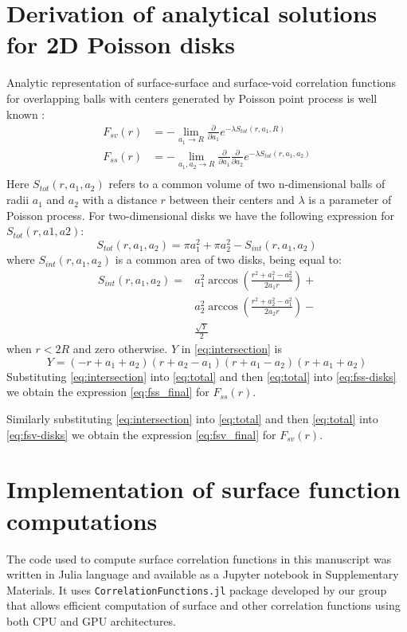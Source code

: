 \documentclass[reprint,amsmath,amssymb,aps,pre]{revtex4-1}
\newcommand{\code}[1]{\colorbox{light-gray}{\texttt{#1}}}
\begin{document}
\section{Derivation of analytical solutions for 2D Poisson disks}
\label{ap:overlapping-disks}
Analytic representation of surface-surface and surface-void correlation
functions for overlapping balls with centers generated by Poisson point process
is well known \cite{Torq_book}:
\begin{align}
  F_{sv}(r) &= -\lim_{a_1 \rightarrow R} \frac{\partial}{\partial a_1}
  e^{-\lambda S_{tot}(r, a_1, R)} \label{eq:fsv-disks} \\
  F_{ss}(r) &= -\lim_{a_1, a_2 \rightarrow R} \frac{\partial}{\partial a_1}
  \frac{\partial}{\partial a_2} e^{-\lambda S_{tot}(r, a_1,
    a_2)} \label{eq:fss-disks} \\
\end{align}
Here $S_{tot}(r, a_1, a_2)$ refers to a common volume of two n-dimensional balls
of radii $a_1$ and $a_2$ with a distance $r$ between their centers and $\lambda$
is a parameter of Poisson process. For two-dimensional disks we have the
following expression for $S_{tot}(r, a1, a2)$:
\begin{equation}
  S_{tot}(r, a_1, a_2) = \pi a_1^2 + \pi a_2^2 - S_{int}(r, a_1, a_2) \label{eq:total}
\end{equation}
where $S_{int}(r, a_1, a_2)$ is a common area of two disks, being equal to:
\cite{Math_stack_link}
\begin{align}
  S_{int}(r, a_1, a_2) =&  a_1^2 \arccos(\frac{r^2+a_1^2-a_2^2}{2a_1r}) + \\
  & a_2^2 \arccos(\frac{r^2+a_2^2-a_1^2}{2a_2r}) - \\
  & \frac{\sqrt{Y}}{2} \label{eq:intersection}
\end{align}
when $r<2R$ and zero otherwise. $Y$ in \cref{eq:intersection} is
\begin{equation*}
  Y = (-r+a_1+a_2)(r+a_2-a_1)(r+a_1-a_2)(r+a_1+a_2)
\end{equation*}
Substituting \cref{eq:intersection} into \cref{eq:total} and then
\cref{eq:total} into \cref{eq:fss-disks} we obtain the expression
\cref{eq:fss_final} for $F_{ss}(r)$.

Similarly substituting \cref{eq:intersection} into \cref{eq:total} and then
\cref{eq:total} into \cref{eq:fsv-disks} we obtain the expression
\cref{eq:fsv_final} for $F_{sv}(r)$.

\appendix
\section{Implementation of surface function computations}
The code used to compute surface correlation functions in this manuscript was
written in Julia language and available as a Jupyter notebook in Supplementary
Materials. It uses \code{CorrelationFunctions.jl} package developed by our group
\cite{CorrFunc.jl_paper} that allows efficient computation of surface and other
correlation functions using both CPU and GPU architectures.
\end{document}
